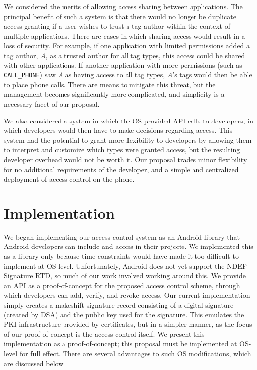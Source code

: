 \documentclass[12pt]{article}
\begin{document}
We considered the merits of allowing access sharing between applications.
The principal benefit of such a system is that there would no longer be duplicate access granting if a user wishes to trust a tag author within the context of multiple applications.
There are cases in which sharing access would result in a loss of security.
For example, if one application with limited permissions added a tag author, \textit{A}, as a trusted author for all tag types, this access could be shared with other applications.
If another application with more permissions (such as \texttt{CALL\_PHONE}) saw \textit{A} as having access to all tag types, \textit{A}'s tags would then be able to place phone calls.
There are means to mitigate this threat, but the management becomes significantly more complicated, and simplicity is a necessary facet of our proposal.

We also considered a system in which the OS provided API calls to developers, in which developers would then have to make decisions regarding access.
This system had the potential to grant more flexibility to developers by allowing them to interpret and customize which types were granted access, but the resulting developer overhead would not be worth it.
Our proposal trades minor flexibility for no additional requirements of the developer, and a simple and centralized deployment of access control on the phone.

\section{Implementation}
We began implementing our access control system as an Android library that Android developers can include and access in their projects.
We implemented this as a library only because time constraints would have made it too difficult to implement at OS-level.
Unfortunately, Android does not yet support the NDEF Signature RTD, so much of our work involved working around this.
We provide an API as a proof-of-concept for the proposed access control scheme, through which developers can add, verify, and revoke access.
Our current implementation simply creates a makeshift signature record consisting of a digital signature (created by DSA) and the public key used for the signature.
This emulates the PKI infrastructure provided by certificates, but in a simpler manner, as the focus of our proof-of-concept is the access control itself.
We present this implementation as a proof-of-concept; this proposal must be implemented at OS-level for full effect.
There are several advantages to such OS modifications, which are discussed below.
\end{document}
